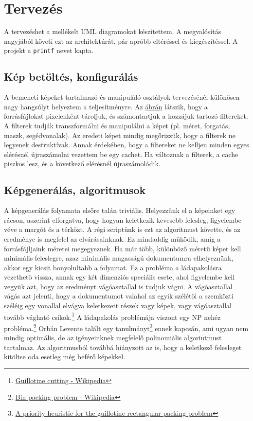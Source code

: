 \chapter{Tervezés}

A tervezéshet a mellékelt UML diagramokat készítettem. A megvalósítás nagyjából követi ezt az architektúrát, pár apróbb eltéréssel és kiegészítéssel.
A projekt a \texttt{printf} nevet kapta.

\section{Kép betöltés, konfigurálás}

A bemeneti képeket tartalmazó és manipuláló osztályok tervezésénél különösen nagy hangsúlyt helyeztem a teljesítményre. Az \href{fig:ImageSource_uml}{ábrán} látszik, hogy a forrásfájlokat pixelenként tároljuk, és számontartjuk a hozzájuk tartozó filtereket. A filterek tudják transzformálni és manipulálni a képet (pl. méret, forgatás, maszk, segédvonalak). Az eredeti képet mindig megőrizzük, hogy a filterek ne legyenek destruktívak. Annak érdekében, hogy a filtereket ne kelljen minden egyes elérésnél újraszámolni vezettem be egy cachet. Ha változnak a filterek, a cache piszkos lesz, és a következő elérésnél újraszámolódik.

\section{Képgenerálás, algoritmusok}

A képgenerálás folyamata elsőre talán triviális. Helyezzünk el a képeinket egy rácson, aszerint elforgatva, hogy hogyan keletkezik kevesebb felesleg, figyelembe véve a margót és a térközt. A régi scriptünk is ezt az algoritmust követte, és az eredménye is megfelel az elvárásainknak. Ez mindaddig működik, amíg a forrásfájljaink méretei megegyeznek. Ha már több, különböző méretű képet kell minimális feleslegre, azaz minimális magasságú dokumentumra elhelyeznünk, akkor egy kicsit bonyolultabb a folyamat. Ez a probléma a ládapakolásra vezethető vissza, annak egy két dimenziós speciális esete, ahol figyelembe kell vegyük azt, hogy az eredményt vágóasztallal is tudjuk vágni. A vágóasztallal vágás azt jelenti, hogy a dokumentumot valahol az egyik szélétől a szemközti széléig egy vonallal elvágva keletkezett részek vagy képek, vagy vágóasztallal tovább vágható csíkok.\footnote{\href{https://en.wikipedia.org/wiki/Guillotine_cutting}{Guillotine cutting - Wikipedia}} A ládapakolás problémája viszont egy NP nehéz probléma.\footnote{\href{https://en.wikipedia.org/wiki/Bin_packing_problem}{Bin packing problem - Wikipedia}} Orbán Levente talált egy tanulmányt\footnote{\href{https://sci-hub.se/10.1016/j.ipl.2015.08.008}{A priority heuristic for the guillotine rectangular packing problem}} ennek kapcsán, ami ugyan nem mindig optimális, de az igényeinknek megfelelő polinomiális algoriutmust tartalmaz. Az algoritmusból továbbá hiányzott az is, hogy a keletkező felesleget kitöltse oda esetleg még beférő képekkel.

